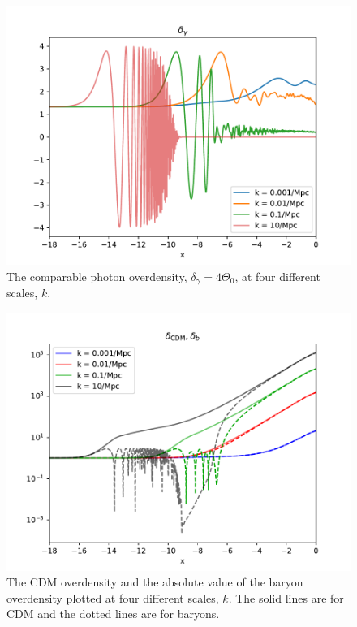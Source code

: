 \documentclass{aa}
\begin{document}
\begin{figure}[H]
   \includegraphics[scale=0.6]{../figures/milestone3/delta_gamma.pdf}
   \caption{The comparable photon overdensity, $\delta_\gamma = 4\Theta_0$, at four different scales, $k$. }\label{fig:delta_gamma}
\end{figure}

\begin{figure}[H]
   \includegraphics[scale=0.6]{../figures/milestone3/delta_cdm_delta_b.pdf}
   \caption{The CDM overdensity and the absolute value of the baryon overdensity plotted at four different scales, $k$. The solid lines are for CDM and the dotted lines are for baryons.}\label{fig:delta_cdm_delta_b}
\end{figure}
\end{document}
